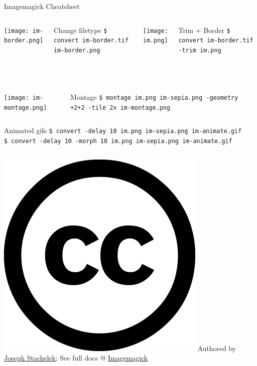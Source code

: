 \documentclass[hyperref={colorlinks,citecolor=pink,linkcolor=red,urlcolor=blue}]{beamer}
\newcommand\Fontvii{\fontsize{7pt}{7.2}\selectfont}
\begin{document}
\begin{frame}{Imagemagick Cheatsheet}
\Fontvii


\begin{minipage}[0.2\textheight]{\textwidth}
	\begin{columns}[T]
			\texttt{[image: im-border.png]}\\
			\begin{exampleblock}{Change filetype}
				\texttt{\$ convert im-border.tif im-border.png}
			\end{exampleblock}	
			\texttt{[image: im.png]}\\
			\begin{exampleblock}{Trim + Border}
				\texttt{\$ convert im-border.tif -trim im.png}
			\end{exampleblock}	
	\end{columns}
\end{minipage}\\


\begin{minipage}[0.2\textheight]{\textwidth}
	\begin{columns}[T]
			\texttt{[image: im-montage.png]}\\
			\begin{exampleblock}{Montage}
				\texttt{\$ montage im.png im-sepia.png -geometry +2+2 -tile 2x im-montage.png}\\
			\end{exampleblock}	
	\end{columns}
\end{minipage}


\begin{minipage}[0.2\textheight]{\textwidth}
	\begin{columns}[T]
			\begin{exampleblock}{Animated gifs}
				\texttt{\$ convert -delay 10 im.png im-sepia.png im-animate.gif}\\
				\texttt{\$ convert -delay 10 -morph 10 im.png im-sepia.png im-animate.gif}
			\end{exampleblock}	
	\end{columns}
\end{minipage}


\includegraphics[height=.15in]{cc.large.png} Authored by \href{http://jsta.github.io}{Joseph Stachelek}; See full docs @
\href{http://www.imagemagick.org}{Imagemagick}
\end{frame}
\end{document}
